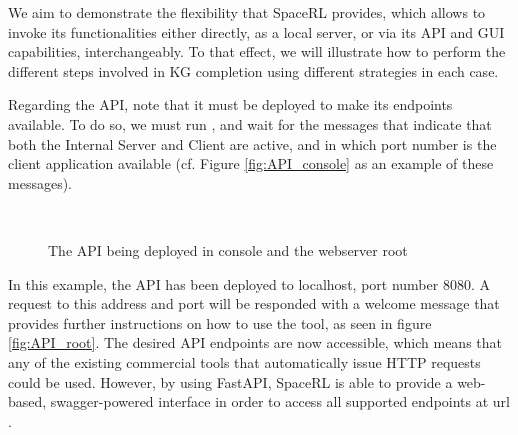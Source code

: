 We aim to demonstrate the flexibility that SpaceRL provides, which allows to invoke its functionalities either directly, as a local server, or via its API and GUI capabilities, interchangeably. To that effect, we will illustrate how to perform the different steps involved in KG completion using different strategies in each case.

Regarding the API, note that it must be deployed to make its endpoints available. To do so, we must run , and wait for the messages that indicate that both the Internal Server and Client are active, and in which port number is the client application available (cf. Figure \ref{fig:API_console} as an example of these messages).

\begin{figure}[!ht]
    \centering
    ~
    \\
    \caption{The API being deployed in console and the webserver root}
    \label{fig:API_base}
\end{figure}

In this example, the API has been deployed to localhost, port number 8080. A request to this address and port will be responded with a welcome message that provides further instructions on how to use the tool, as seen in figure \ref{fig:API_root}. The desired API endpoints are now accessible, which means that any of the existing commercial tools that automatically issue HTTP requests could be used. However, by using FastAPI, SpaceRL is able to provide a web-based, swagger-powered interface in order to access all supported endpoints at url .

